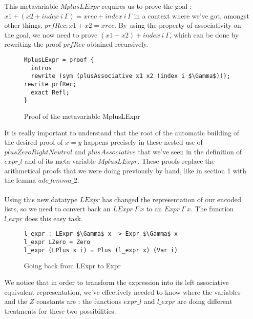 This metavariable $MplusLExpr$ requires us to prove the goal : $x1 + (x2 + index\ i\ \Gamma) = xrec + index\ i\ \Gamma$ in a context where we've got, amongst other things, $prfRec : x1 + x2 = xrec$.
By using the property of associativity on the goal, we now need to prove $(x1 + x2) + index\ i\ \Gamma$, which can be done by rewriting the proof $prfRec$ obtained recursively.

\begin{figure}[H]
\figrule
\begin{center}
\begin{lstlisting}
MplusLExpr = proof {
  intros
  rewrite (sym (plusAssociative x1 x2 (index i $\Gamma$))); rewrite prfRec; 
  exact Refl;
}
\end{lstlisting}
\end{center}
\caption{Proof of the metavariable MplusLExpr}
\figrule
\end{figure}

It is really important to understand that the root of the automatic building of the desired proof of $x=y$ happens precisely in these nested use of $plusZeroRightNeutral$ and $plusAssociative$ that we've seen in the definition of $expr\_l$ and of its meta-variable $MplusLExpr$. These proofs replace the arithmetical proofs that we were doing previously by hand, like in section 1 with the lemma $adc\_lemma\_2$. \\
\\
Using this new datatype $LExpr$ has changed the representation of our encoded lists, so we need to convert back an $LExpr\ \Gamma\ x$ to an $Expr\ \Gamma\ x$. The function $l\_expr$ does this easy task.
\begin{figure}[H]
\figrule
\begin{center}
\begin{lstlisting}
l_expr : LExpr $\Gamma$ x -> Expr $\Gamma$ x
l_expr LZero = Zero
l_expr (LPlus x i) = Plus (l_expr x) (Var i)
\end{lstlisting}
\end{center}
\caption{Going back from LExpr to Expr}
\figrule
\end{figure}


We notice that in order to transform the expression into its left associative equivalent representation, we've effectively needed to know where the variables and the $Z$ constants are : the functions $expr\_l$ and $l\_expr$ are doing different treatments for these two possibilities. \\
\\

